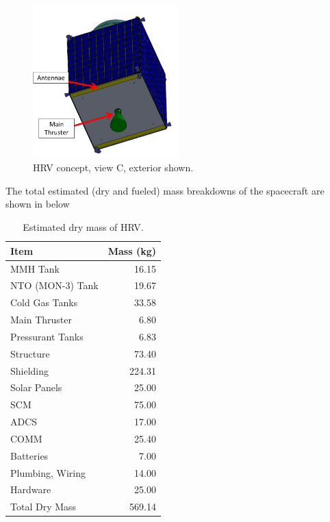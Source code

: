 \documentclass[paper=letter, fontsize=11pt]{scrartcl} %
\numberwithin{equation}{section} %
\numberwithin{figure}{section} %
\numberwithin{table}{section} %
\begin{document}
\begin{figure}[H]
    \begin{center}
        \includegraphics[width=0.5\textwidth]{Pics/4.png}
        \caption{HRV concept, view C, exterior shown.}
        \label{fig:p4}
    \end{center}
\end{figure}

The total estimated (dry and fueled) mass breakdowns of the spacecraft are shown in below

\begin{table}[H]
    \centering
    \begin{tabular}{l r}
        \toprule
        Item             & Mass (kg) \\
        \midrule
        MMH Tank         & 16.15     \\
        NTO (MON-3) Tank & 19.67     \\
        Cold Gas Tanks   & 33.58     \\
        Main Thruster    & 6.80      \\
        Pressurant Tanks & 6.83      \\
        Structure        & 73.40     \\
        Shielding        & 224.31    \\
        Solar Panels     & 25.00     \\
        SCM              & 75.00     \\
        ADCS             & 17.00     \\
        COMM             & 25.40     \\
        Batteries        & 7.00      \\
        Plumbing, Wiring & 14.00     \\
        Hardware         & 25.00     \\
        \midrule
        Total Dry Mass   & 569.14    \\
        \bottomrule
    \end{tabular}
    \caption{Estimated dry mass of HRV.}
    \label{table:dry_mass}
\end{table}
\end{document}
